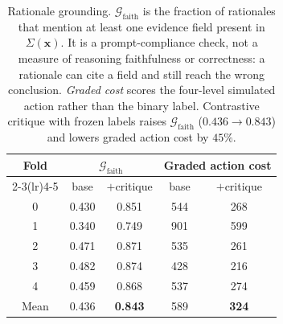 \begin{table}[!t]
\centering
\caption{Rationale grounding. $\mathcal{G}_{\mathrm{faith}}$ is the fraction of rationales that mention at least one evidence field present in $\Sigma(\mathbf{x})$. It is a prompt-compliance check, not a measure of reasoning faithfulness or correctness: a rationale can cite a field and still reach the wrong conclusion. \emph{Graded cost} scores the four-level simulated action rather than the binary label. Contrastive critique with frozen labels raises $\mathcal{G}_{\mathrm{faith}}$ ($0.436{\rightarrow}0.843$) and lowers graded action cost by $45\%$.}
\label{tab:grounding}
\begin{tabular}{ccccc}
\toprule
\multirow{2}{*}{Fold} & \multicolumn{2}{c}{$\mathcal{G}_{\mathrm{faith}}$} & \multicolumn{2}{c}{Graded action cost} \\
\cmidrule(lr){2-3}\cmidrule(lr){4-5}
 & base & $+$critique & base & $+$critique \\
\midrule
0 & 0.430 & 0.851 & 544 & 268 \\
1 & 0.340 & 0.749 & 901 & 599 \\
2 & 0.471 & 0.871 & 535 & 261 \\
3 & 0.482 & 0.874 & 428 & 216 \\
4 & 0.459 & 0.868 & 537 & 274 \\
\midrule
Mean & 0.436 & \textbf{0.843} & 589 & \textbf{324} \\
\bottomrule
\end{tabular}
\end{table}
